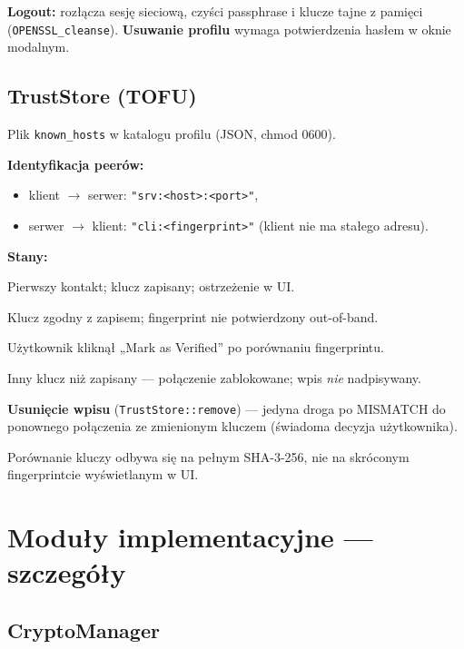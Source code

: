 \documentclass[12pt,a4paper]{article}
\begin{document}
\textbf{Logout:} rozłącza sesję sieciową, czyści passphrase i klucze tajne z pamięci (\texttt{OPENSSL\_cleanse}). \textbf{Usuwanie profilu} wymaga potwierdzenia hasłem w oknie modalnym.

\subsection{TrustStore (TOFU)}

Plik \texttt{known\_hosts} w katalogu profilu (JSON, chmod 0600).

\textbf{Identyfikacja peerów:}
\begin{itemize}
    \item klient $\rightarrow$ serwer: \texttt{"srv:<host>:<port>"},
    \item serwer $\rightarrow$ klient: \texttt{"cli:<fingerprint>"} (klient nie ma stałego adresu).
\end{itemize}

\textbf{Stany:}
\begin{description}[style=nextline]
    \item[UNVERIFIED] Pierwszy kontakt; klucz zapisany; ostrzeżenie w UI.
    \item[KNOWN] Klucz zgodny z zapisem; fingerprint nie potwierdzony out-of-band.
    \item[VERIFIED] Użytkownik kliknął „Mark as Verified'' po porównaniu fingerprintu.
    \item[MISMATCH] Inny klucz niż zapisany --- połączenie zablokowane; wpis \emph{nie} nadpisywany.
\end{description}

\textbf{Usunięcie wpisu} (\texttt{TrustStore::remove}) --- jedyna droga po MISMATCH do ponownego połączenia ze zmienionym kluczem (świadoma decyzja użytkownika).

Porównanie kluczy odbywa się na pełnym SHA-3-256, nie na skróconym fingerprintcie wyświetlanym w UI.

\section{Moduły implementacyjne --- szczegóły}

\subsection{CryptoManager}
\end{document}
